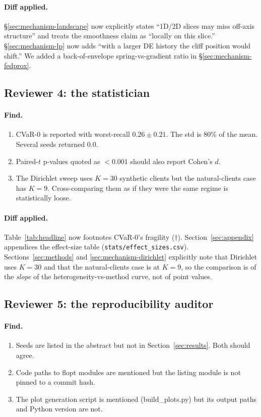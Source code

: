 \paragraph{Diff applied.} \S\ref{sec:mechanism-landscape} now explicitly
states ``1D/2D slices may miss off-axis structure'' and treats the smoothness
claim as ``locally on this slice.'' \S\ref{sec:mechanism-lp} now adds ``with a
larger DE history the cliff position would shift.'' We added a
back-of-envelope spring-vs-gradient ratio in \S\ref{sec:mechanism-fedprox}.

\subsection{Reviewer 4: the statistician}
\paragraph{Find.}
\begin{enumerate}[leftmargin=*,nosep]
    \item CVaR-$0$ is reported with worst-recall $0.26 \pm 0.21$. The std is
        $80\%$ of the mean. Several seeds returned $0.0$.
    \item Paired-$t$ p-values quoted as $< 0.001$ should also report Cohen's
        $d$.
    \item The Dirichlet sweep uses $K\!=\!30$ synthetic clients but the
        natural-clients case has $K\!=\!9$. Cross-comparing them as if they
        were the same regime is statistically loose.
\end{enumerate}
\paragraph{Diff applied.} Table~\ref{tab:headline} now footnotes CVaR-$0$'s
fragility ($\dagger$). Section~\ref{sec:appendix} appendices the effect-size
table (\texttt{stats/effect\_sizes.csv}). Sections~\ref{sec:methods} and
\ref{sec:mechanism-dirichlet} explicitly note that Dirichlet uses $K\!=\!30$
and that the natural-clients case is at $K\!=\!9$, so the comparison is of
the \emph{slope} of the heterogeneity-vs-method curve, not of point values.

\subsection{Reviewer 5: the reproducibility auditor}
\paragraph{Find.}
\begin{enumerate}[leftmargin=*,nosep]
    \item Seeds are listed in the abstract but not in
        Section~\ref{sec:results}. Both should agree.
    \item Code paths to flopt modules are mentioned but the listing module is
        not pinned to a commit hash.
    \item The plot generation script is mentioned (build\_plots.py) but its
        output paths and Python version are not.
\end{enumerate}
